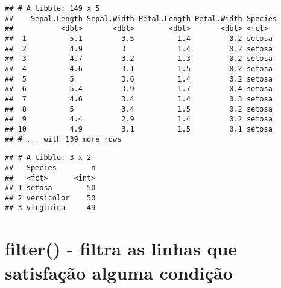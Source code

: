 \documentclass[]{book}
\newenvironment{Shaded}{\begin{snugshade}}{\end{snugshade}}
\newcommand{\KeywordTok}[1]{\textcolor[rgb]{0.13,0.29,0.53}{\textbf{#1}}}
\newcommand{\NormalTok}[1]{#1}
\newcommand{\OperatorTok}[1]{\textcolor[rgb]{0.81,0.36,0.00}{\textbf{#1}}}
\newcommand{\StringTok}[1]{\textcolor[rgb]{0.31,0.60,0.02}{#1}}
\begin{document}
\begin{Shaded}
\end{Shaded}

\begin{verbatim}
## # A tibble: 149 x 5
##    Sepal.Length Sepal.Width Petal.Length Petal.Width Species
##           <dbl>       <dbl>        <dbl>       <dbl> <fct>  
##  1          5.1         3.5          1.4         0.2 setosa 
##  2          4.9         3            1.4         0.2 setosa 
##  3          4.7         3.2          1.3         0.2 setosa 
##  4          4.6         3.1          1.5         0.2 setosa 
##  5          5           3.6          1.4         0.2 setosa 
##  6          5.4         3.9          1.7         0.4 setosa 
##  7          4.6         3.4          1.4         0.3 setosa 
##  8          5           3.4          1.5         0.2 setosa 
##  9          4.4         2.9          1.4         0.2 setosa 
## 10          4.9         3.1          1.5         0.1 setosa 
## # ... with 139 more rows
\end{verbatim}

\begin{Shaded}
\end{Shaded}

\begin{verbatim}
## # A tibble: 3 x 2
##   Species        n
##   <fct>      <int>
## 1 setosa        50
## 2 versicolor    50
## 3 virginica     49
\end{verbatim}

\hypertarget{filter---filtra-as-linhas-que-satisfauxe7uxe3o-alguma-condiuxe7uxe3o}{%
\section{filter() - filtra as linhas que satisfação alguma condição}\label{filter---filtra-as-linhas-que-satisfauxe7uxe3o-alguma-condiuxe7uxe3o}}

\begin{Shaded}
\end{Shaded}
\end{document}
